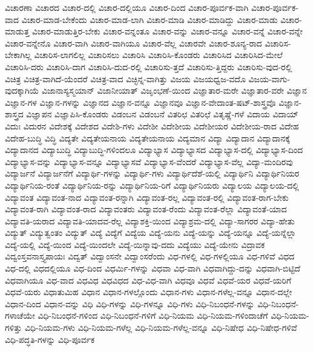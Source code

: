 {ವಿಚಾರಣಾ
ವಿಚಾರದ
ವಿಚಾರ-ದಲ್ಲಿ
ವಿಚಾರ-ದಲ್ಲಿಯೂ
ವಿಚಾರ-ದಿಂದ
ವಿಚಾರ-ಪೂರ್ವಕ-ವಾಗಿ
ವಿಚಾರ-ಪೂರ್ವಕ-ವಾದ
ವಿಚಾರ-ಮಾಡ-ಬೇಕೆಂದು
ವಿಚಾರ-ಮಾಡ-ಲಾಗಿ
ವಿಚಾರ-ಮಾಡಿ
ವಿಚಾರ-ಮಾಡಿದ್ದು
ವಿಚಾರ-ಮಾಡು
ವಿಚಾರ-ಮಾಡುತ್ತ
ವಿಚಾರ-ಮಾಡುತ್ತಿರ-ಬೇಕು
ವಿಚಾರ-ವನ್ನಂತೂ
ವಿಚಾರ-ವನ್ನು
ವಿಚಾರ-ವನ್ನೂ
ವಿಚಾರ-ವನ್ನೆ
ವಿಚಾರ-ವನ್ನೇ
ವಿಚಾರ-ವನ್ನೇನೊ
ವಿಚಾರ-ವಾಗಿ
ವಿಚಾರ-ವಾಗಿಯೂ
ವಿಚಾರ-ವೆಲ್ಲ
ವಿಚಾರವೇ
ವಿಚಾರ-ಶೂನ್ಯ-ರಾದ
ವಿಚಾರಿಸ-ಬೇಕಾಗಿಲ್ಲ
ವಿಚಾರಿಸ-ಲಾಗಲಿಲ್ಲ
ವಿಚಾರಿಸಲು
ವಿಚಾರಿಸಿ
ವಿಚಾರಿಸಿ-ಕೊಂಡರು
ವಿಚಾರಿಸಿದ
ವಿಚಾರಿಸಿದ-ಮೇಲೆ
ವಿಚಾರಿಸಿ-ದರು
ವಿಚಾರಿಸಿ-ದಾಗ
ವಿಚಾರಿಸಿ-ದುದ-ರಲ್ಲಿ
ವಿಚಾರಿಸು-ತ್ತದೆ
ವಿಚಾರಿಸು-ತ್ತಿದ್ದರು
ವಿಚಾರಿಸು-ವುದ-ರಲ್ಲಿ
ವಿಚಿತ್ರ
ವಿಚಿತ್ರ-ವಾಗಿದೆ-ಯೆಂದರೆ
ವಿಚಿತ್ರ-ವಾದ
ವಿಚ್ಛಿನ್ನ-ವಾಗಿತ್ತು
ವಿಜಯ
ವಿಜಯಧ್ವಜ-ವದೊ
ವಿಜಯ-ವಾಗು-ವುದಕ್ಕಾಗಿಯೆ
ವಿಜಾನಾಸ್ಯಸ್ಮಯಾನ್
ವಿಜಾನೀಯಾತ್
ವಿಜೃಂಭಣೆ-ಯಿಂದ
ವಿಜ್ಞಾತಾರ-ಮರೇ
ವಿಜ್ಞಾತಾರ-ವರೇ
ವಿಜ್ಞಾನ
ವಿಜ್ಞಾನ-ಗಳ
ವಿಜ್ಞಾನ-ಗಳನ್ನು
ವಿಜ್ಞಾನದ
ವಿಜ್ಞಾನ-ವನ್ನೂ
ವಿಜ್ಞಾನವೂ
ವಿಜ್ಞಾನ-ವೇದಾಂತ-ಷಟ್-ಶಾಸ್ತ್ರವೊ
ವಿಜ್ಞಾನ-ಶಾಸ್ತ್ರದ
ವಿಜ್ಞಾಪನ
ವಿಜ್ಞಾಪಿಸಿ-ಕೊಂಡರು
ವಿಡಂಬನ
ವಿಡಂಬನೆ
ವಿತರಿಛ
ವಿತರಿಛೆ
ವಿತೃಷ್ಣೆ-ಗಳೆ
ವಿದಾಯ
ವಿದಾಯ್
ವಿದುಃ
ವಿದುರನ
ವಿದೇಶಕ್ಕೆ
ವಿದೇಶದ
ವಿದೇಶಿ-ಗಳು
ವಿದೇಶೀ
ವಿದೇಶೀಯ
ವಿದೇಶೀಯರ
ವಿದೇಶೀಯ-ರಾದ
ವಿದೇಹ
ವಿದೇಹ-ಬುದ್ಧಿ
ವಿದ್ಧಿ
ವಿದ್ಯತೇ
ವಿದ್ಯತೇಯನಾಯ
ವಿದ್ಯತೇಯನಾಯ
ವಿದ್ಯಮಾನ
ವಿದ್ಯಾ
ವಿದ್ಯಾದಾನ
ವಿದ್ಯಾದಾನಕ್ಕೆ
ವಿದ್ಯಾದಾನದ
ವಿದ್ಯಾಬುದ್ಧಿ
ವಿದ್ಯಾಬುದ್ಧಿ-ಗಳಿಂದಲೂ
ವಿದ್ಯಾಭ್ಯಾಸ
ವಿದ್ಯಾಭ್ಯಾಸದ
ವಿದ್ಯಾಭ್ಯಾಸ-ದಲ್ಲಿ
ವಿದ್ಯಾಭ್ಯಾಸ-ದಿಂದ
ವಿದ್ಯಾಭ್ಯಾಸ-ವನ್ನು
ವಿದ್ಯಾಭ್ಯಾಸ-ವನ್ನೂ
ವಿದ್ಯಾಭ್ಯಾಸವೆ
ವಿದ್ಯಾಭ್ಯಾಸ-ವೆಂದರೆ
ವಿದ್ಯಾಭ್ಯಾಸ-ವೆಲ್ಲ
ವಿದ್ಯಾ-ಮಂದಿರವು
ವಿದ್ಯಾರ್ಜನೆ
ವಿದ್ಯಾರ್ಜನೆಗೆ
ವಿದ್ಯಾರ್ಥಿ-ಗಳನ್ನು
ವಿದ್ಯಾರ್ಥಿ-ಗಳು
ವಿದ್ಯಾರ್ಥಿದೆಶೆ-ಯಲ್ಲಿ
ವಿದ್ಯಾರ್ಥಿನಿ
ವಿದ್ಯಾರ್ಥಿನಿಯರ
ವಿದ್ಯಾರ್ಥಿನಿಯ-ರಂತೆ
ವಿದ್ಯಾರ್ಥಿನಿಯ-ರನ್ನು
ವಿದ್ಯಾರ್ಥಿನಿಯ-ರಿಗೆ
ವಿದ್ಯಾರ್ಥಿನಿಯರು
ವಿದ್ಯಾಲಯ
ವಿದ್ಯಾಲಯ-ದಲ್ಲಿ
ವಿದ್ಯಾವಂತ
ವಿದ್ಯಾವಂತ-ನಾದ
ವಿದ್ಯಾವಂತ-ರನ್ನಾಗಿ
ವಿದ್ಯಾವಂತ-ರಲ್ಲ
ವಿದ್ಯಾವಂತ-ರಲ್ಲಿ
ವಿದ್ಯಾವಂತ-ರಾಗ-ಬೇಕು
ವಿದ್ಯಾವಂತ-ರಾಗಿ
ವಿದ್ಯಾವಂತ-ರಾದ
ವಿದ್ಯಾವಂತರು
ವಿದ್ಯಾವಂತ-ರೆಂದು
ವಿದ್ಯಾವಂತ-ರೆಲ್ಲಾ
ವಿದ್ಯಾವಂತೆ-ಯಾದ
ವಿದ್ಯಾವತಿ-ಯರಾದ
ವಿದ್ಯಾವತಿ-ಯಾದವ-ರೆಲ್ಲ
ವಿದ್ಯಾಶಕ್ತಿ-ಯಿಂದ
ವಿದ್ಯಾಶ್ರಮ-ದಲ್ಲಿ
ವಿದ್ಯಾ-ಸಾಗರರ
ವಿದ್ಯಾ-ಹೇತು
ವಿದ್ಯುತ್
ವಿದ್ಯುತ್ವಂತಂ
ವಿದ್ಯುತ್
ವಿದ್ಯೆ
ವಿದ್ಯೆಗೆ
ವಿದ್ಯೆಯ
ವಿದ್ಯೆ-ಯನು
ವಿದ್ಯೆ-ಯನ್ನು
ವಿದ್ಯೆ-ಯನ್ನೂ
ವಿದ್ಯೆ-ಯನ್ನೆಲ್ಲಾ
ವಿದ್ಯೆ-ಯಲ್ಲಿ
ವಿದ್ಯೆ-ಯಿಂದ
ವಿದ್ಯೆ-ಯಿಂದಲೇ
ವಿದ್ಯೆ-ಯಿನ್ನಾವು-ದದು
ವಿದ್ಯೆಯು
ವಿದ್ಯೆ-ಯೇನು
ವಿದ್ರಾವಕ
ವಿದ್ವಂಸ್ತವನಾಸ್ತ್ಯಪಾಯಃ
ವಿದ್ವತ್
ವಿದ್ವಾಂಸನೇ
ವಿದ್ವಾಂಸರೆಂದು
ವಿಧ-ಗಳಲ್ಲಿ
ವಿಧ-ಗಳಲ್ಲಿಯೂ
ವಿಧ-ಗಳಿವೆ
ವಿಧದ
ವಿಧ-ದಲ್ಲಿ
ವಿಧದಲ್ಲಿಯೂ
ವಿಧ-ದಿಂದ
ವಿಧರ್ಮಿ-ಗಳನ್ನು
ವಿಧವಾ
ವಿಧ-ವಾಗಿ
ವಿಧವಾಗಿದ್ದು-ದನ್ನು
ವಿಧವಾಗಿ-ಬಿಟ್ಟಿದೆ
ವಿಧವಾಗಿಯೂ
ವಿಧ-ವಾದ
ವಿಧವಿಧ
ವಿಧವಿಧದ
ವಿಧ-ವಿಧ-ವಾಗಿ
ವಿಧವೂ
ವಿಧವೆ
ವಿಧವೆ-ಯರ
ವಿಧವೆ-ಯರಿಗೆ
ವಿಧವೆ-ಯರು
ವಿಧಾತುಮಿಹ
ವಿಧಾನ
ವಿಧಾನ-ಗಳಲ್ಲೊಂದು
ವಿಧಾನ-ಗಳು
ವಿಧಾನ-ಗಳೆಲ್ಲ-ವನ್ನೂ
ವಿಧಾನ-ದಲ್ಲೇ
ವಿಧಾನ-ದಿಂದ
ವಿಧಾನ-ವನ್ನು
ವಿಧಿ
ವಿಧಿ-ಗಳನ್ನು
ವಿಧಿ-ಗಳನ್ನೂ
ವಿಧಿ-ಗಳು
ವಿಧಿ-ನಿಬಂಧನೆ-ಗಳನ್ನು
ವಿಧಿ-ನಿಬಂಧನೆ-ಗಳಾಚೆಯೇ
ವಿಧಿ-ನಿಬಂಧನೆ-ಗಳಿಂದ
ವಿಧಿ-ನಿಬಂಧನೆ-ಗಳಿಗೆ
ವಿಧಿ-ನಿಯಮ
ವಿಧಿ-ನಿಯಮ-ಗಳಿಂದಾಚೆಗೆ
ವಿಧಿ-ನಿಯಮ-ಗಳಿತ್ತು
ವಿಧಿ-ನಿಯಮ-ಗಳು
ವಿಧಿ-ನಿಯಮ-ಗಳೆಲ್ಲ
ವಿಧಿ-ನಿಯಮ-ಗಳೆಲ್ಲ-ವನ್ನೂ
ವಿಧಿ-ನಿಷೇಧ
ವಿಧಿ-ನಿಷೇಧ-ಗಳಿವೆ
ವಿಧಿ-ಪದ್ಧತಿ-ಗಳನ್ನು
ವಿಧಿ-ಪೂರ್ವಕ
}
